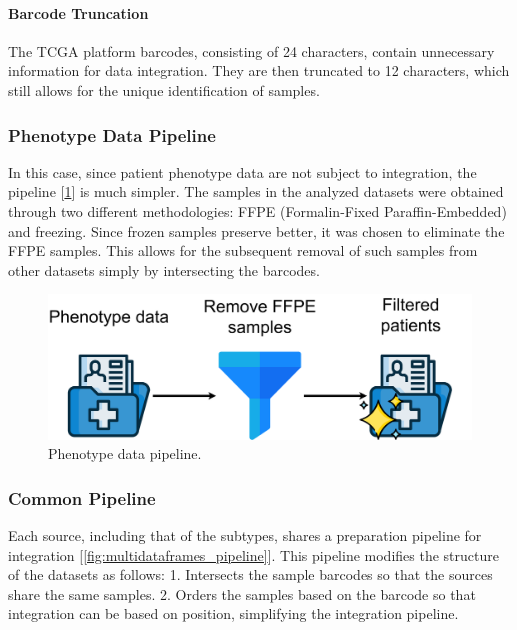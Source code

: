\documentclass[12pt,a4paper]{article}
\begin{document}
\paragraph{Barcode Truncation} \hfill \break
The TCGA platform barcodes, consisting of 24 characters, contain unnecessary information for data integration. They are then truncated to 12 characters, which still allows for the unique identification of samples.

\subsubsection{Phenotype Data Pipeline}
In this case, since patient phenotype data are not subject to integration, the pipeline [\ref{fig:phenotype_pipeline}] is much simpler.
The samples in the analyzed datasets were obtained through two different methodologies: FFPE (Formalin-Fixed Paraffin-Embedded) and freezing.
Since frozen samples preserve better, it was chosen to eliminate the FFPE samples. This allows for the subsequent removal of such samples from other datasets simply by intersecting the barcodes.

\begin{figure}[htbp!]
\begin{center}
\includegraphics[width=0.9\columnwidth]{./static/phenotype_pipeline.png}
\end{center}
\caption{Phenotype data pipeline.}
\label{fig:phenotype_pipeline}
\end{figure}

\subsubsection{Common Pipeline}
Each source, including that of the subtypes, shares a preparation pipeline for integration [\ref{fig:multidataframes_pipeline}]. This pipeline modifies the structure of the datasets as follows:
1. Intersects the sample barcodes so that the sources share the same samples.
2. Orders the samples based on the barcode so that integration can be based on position, simplifying the integration pipeline.
\end{document}
